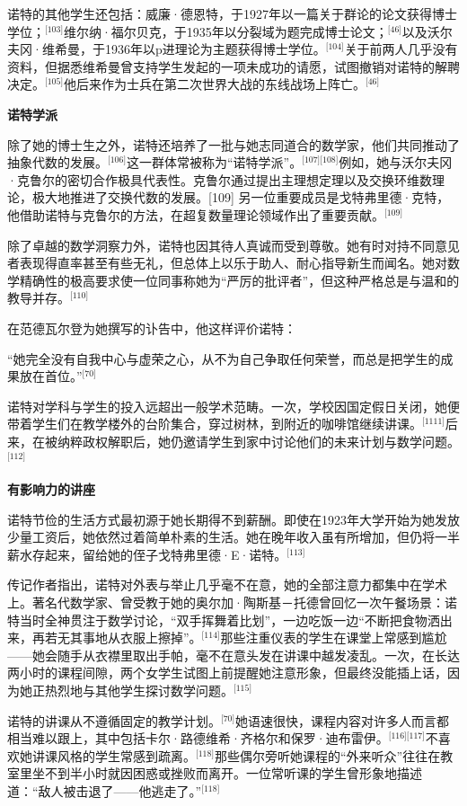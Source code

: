 诺特的其他学生还包括：威廉·德恩特，于1927年以一篇关于群论的论文获得博士学位；\(^\text{[103]}\)维尔纳·福尔贝克，于1935年以分裂域为题完成博士论文；\(^\text{[46]}\)以及沃尔夫冈·维希曼，于1936年以p进理论为主题获得博士学位。\(^\text{[104]}\)关于前两人几乎没有资料，但据悉维希曼曾支持学生发起的一项未成功的请愿，试图撤销对诺特的解聘决定。\(^\text{[105]}\)他后来作为士兵在第二次世界大战的东线战场上阵亡。\(^\text{[46]}\)

\textbf{诺特学派}

除了她的博士生之外，诺特还培养了一批与她志同道合的数学家，他们共同推动了抽象代数的发展。\(^\text{[106]}\)这一群体常被称为“诺特学派”。\(^\text{[107][108]}\)例如，她与沃尔夫冈·克鲁尔的密切合作极具代表性。克鲁尔通过提出主理想定理以及交换环维数理论，极大地推进了交换代数的发展。[109] 另一位重要成员是戈特弗里德·克特，他借助诺特与克鲁尔的方法，在超复数量理论领域作出了重要贡献。\(^\text{[109]}\)

除了卓越的数学洞察力外，诺特也因其待人真诚而受到尊敬。她有时对持不同意见者表现得直率甚至有些无礼，但总体上以乐于助人、耐心指导新生而闻名。她对数学精确性的极高要求使一位同事称她为“严厉的批评者”，但这种严格总是与温和的教导并存。\(^\text{[110]}\)

在范德瓦尔登为她撰写的讣告中，他这样评价诺特：

“她完全没有自我中心与虚荣之心，从不为自己争取任何荣誉，而总是把学生的成果放在首位。”\(^\text{[70]}\)

诺特对学科与学生的投入远超出一般学术范畴。一次，学校因国定假日关闭，她便带着学生们在教学楼外的台阶集合，穿过树林，到附近的咖啡馆继续讲课。\(^\text{[1111]}\)后来，在被纳粹政权解职后，她仍邀请学生到家中讨论他们的未来计划与数学问题。\(^\text{[112]}\)

\textbf{有影响力的讲座}

诺特节俭的生活方式最初源于她长期得不到薪酬。即使在1923年大学开始为她发放少量工资后，她依然过着简单朴素的生活。她在晚年收入虽有所增加，但仍将一半薪水存起来，留给她的侄子戈特弗里德·E·诺特。\(^\text{[113]}\)

传记作者指出，诺特对外表与举止几乎毫不在意，她的全部注意力都集中在学术上。著名代数学家、曾受教于她的奥尔加·陶斯基－托德曾回忆一次午餐场景：诺特当时全神贯注于数学讨论，“双手挥舞着比划”，一边吃饭一边“不断把食物洒出来，再若无其事地从衣服上擦掉”。\(^\text{[114]}\)那些注重仪表的学生在课堂上常感到尴尬——她会随手从衣襟里取出手帕，毫不在意头发在讲课中越发凌乱。一次，在长达两小时的课程间隙，两个女学生试图上前提醒她注意形象，但最终没能插上话，因为她正热烈地与其他学生探讨数学问题。\(^\text{[115]}\)

诺特的讲课从不遵循固定的教学计划。\(^\text{[70]}\)她语速很快，课程内容对许多人而言都相当难以跟上，其中包括卡尔·路德维希·齐格尔和保罗·迪布雷伊。\(^\text{[116][117]}\)不喜欢她讲课风格的学生常感到疏离。\(^\text{[118]}\)那些偶尔旁听她课程的“外来听众”往往在教室里坐不到半小时就因困惑或挫败而离开。一位常听课的学生曾形象地描述道：“敌人被击退了——他逃走了。”\(^\text{[118]}\)

